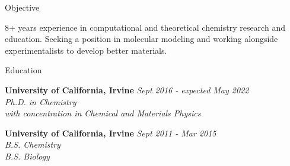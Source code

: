 \documentclass{resume} %
\begin{document}
{\centerline { } }

\begin{rSection}{Objective}
  
  8+ years experience in computational and theoretical chemistry research and education.
  Seeking a position in molecular modeling and working alongside experimentalists to develop
  better materials. 

\end{rSection}

\begin{rSection}{Education}

{\bf University of California, Irvine} \hfill {\em Sept 2016 - expected May 2022} 
\\{\textit{Ph.D. in Chemistry \\
    with concentration in Chemical and Materials Physics}}

{\bf University of California, Irvine} \hfill {\em Sept 2011 - Mar 2015} 
\\ { \textit{B.S. Chemistry}} \hfill
\\ { \textit{B.S. Biology}} \hfill

\end{rSection}
\end{document}
